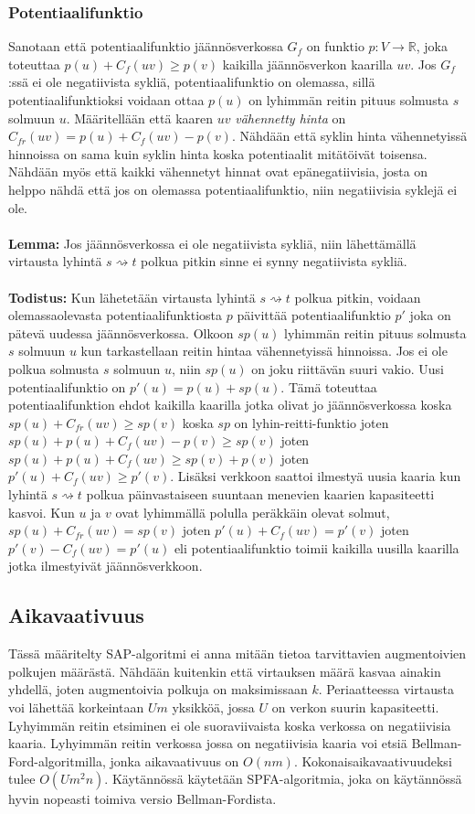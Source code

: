\documentclass[a4paper, 11pt]{article}
\begin{document}
\subsubsection*{Potentiaalifunktio}
Sanotaan että potentiaalifunktio jäännösverkossa $G_f$ on funktio 
$p: V \rightarrow \mathbb{R}$, joka toteuttaa
$p(u) + C_f(uv) \ge p(v)$ kaikilla jäännösverkon kaarilla $uv$. Jos $G_f$:ssä ei ole 
negatiivista sykliä, potentiaalifunktio
on olemassa, sillä potentiaalifunktioksi voidaan ottaa $p(u)$ on lyhimmän reitin pituus
solmusta $s$ solmuun $u$.
Määritellään että kaaren $uv$ \textit{vähennetty hinta} on $C_{fr}(uv) = p(u) + C_f(uv) - p(v)$.
Nähdään että syklin hinta vähennetyissä hinnoissa on sama kuin syklin hinta koska potentiaalit
mitätöivät toisensa. Nähdään myös
että kaikki vähennetyt hinnat ovat epänegatiivisia, josta on helppo nähdä että jos on
olemassa potentiaalifunktio, niin negatiivisia syklejä ei ole.\\\\
\noindent
\textbf{Lemma:} Jos jäännösverkossa ei ole negatiivista sykliä, niin lähettämällä virtausta
lyhintä $s \rightsquigarrow t$ polkua pitkin sinne ei synny negatiivista sykliä.\\\\
\noindent
\textbf{Todistus:} Kun lähetetään virtausta lyhintä $s \rightsquigarrow t$ polkua pitkin, voidaan
olemassaolevasta potentiaalifunktiosta $p$ 
päivittää potentiaalifunktio $p'$ joka on pätevä uudessa jäännösverkossa.
Olkoon $sp(u)$ lyhimmän reitin pituus
solmusta $s$ solmuun $u$ kun tarkastellaan reitin hintaa vähennetyissä hinnoissa.
Jos ei ole polkua solmusta $s$ solmuun $u$, niin $sp(u)$ on joku riittävän suuri vakio.
Uusi potentiaalifunktio on $p'(u) = p(u) + sp(u)$. Tämä toteuttaa potentiaalifunktion
ehdot kaikilla kaarilla jotka olivat jo jäännösverkossa koska $sp(u) + C_{fr}(uv) \ge sp(v)$
koska $sp$ on lyhin-reitti-funktio joten $sp(u) + p(u) + C_f(uv) - p(v) \ge sp(v)$
joten $sp(u) + p(u) + C_f(uv) \ge sp(v) + p(v)$ joten $p'(u) + C_f(uv) \ge p'(v)$.
Lisäksi verkkoon saattoi ilmestyä uusia kaaria kun lyhintä $s \rightsquigarrow t$ polkua
päinvastaiseen suuntaan menevien kaarien kapasiteetti kasvoi. Kun $u$ ja $v$ ovat
lyhimmällä polulla peräkkäin olevat solmut, $sp(u) + C_{fr}(uv) = sp(v)$ joten
$p'(u) + C_f(uv) = p'(v)$ joten $p'(v) - C_f(uv) = p'(u)$ eli potentiaalifunktio
toimii kaikilla uusilla kaarilla jotka ilmestyivät jäännösverkkoon.
\subsection*{Aikavaativuus}
Tässä määritelty SAP-algoritmi ei anna mitään tietoa tarvittavien augmentoivien
polkujen määrästä. Nähdään kuitenkin että virtauksen määrä kasvaa ainakin yhdellä, joten
augmentoivia polkuja on maksimissaan $k$. Periaatteessa virtausta voi lähettää 
korkeintaan $Um$ yksikköä, jossa $U$ on verkon suurin kapasiteetti. Lyhyimmän reitin
etsiminen ei ole suoraviivaista koska verkossa on negatiivisia kaaria. Lyhyimmän reitin
verkossa jossa on negatiivisia kaaria
voi etsiä Bellman-Ford-algoritmilla, jonka aikavaativuus on $O(nm)$.
Kokonaisaikavaativuudeksi tulee $O(Um^2n)$. Käytännössä käytetään
SPFA-algoritmia, joka on käytännössä hyvin nopeasti toimiva versio Bellman-Fordista.
\end{document}
